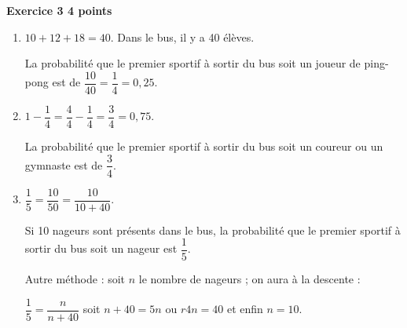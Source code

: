 \textbf{Exercice 3 \hfill 4 points}

\medskip

%

\begin{enumerate}
\item %
$10 + 12 +18 = 40$. Dans le bus, il y a 40 élèves.

La probabilité que le premier sportif à sortir du bus soit un joueur de ping-pong est de
$\dfrac{10}{40} = \dfrac{1}{4}  = 0,25$.
\item %
$1 - \dfrac{1}{4}  = \dfrac{4}{4} - \dfrac{1}{4} = \dfrac{3}{4} = 0,75$.

La probabilité que le premier sportif à sortir du bus soit un coureur ou un gymnaste est de
$\dfrac{3}{4}$.
\item %

$\dfrac{1}{5} = \dfrac{10}{50} = \dfrac{10}{10+40}$.

Si 10 nageurs sont présents dans le bus, la probabilité
que le premier sportif à sortir du bus soit un nageur est
$\dfrac{1}{5}$.

Autre méthode : soit $n$ le nombre de nageurs ; on aura à la descente :

$\dfrac{1}{5} = \dfrac{n}{n + 40}$ soit $n + 40 = 5n$ ou $r4n = 40$ et enfin $n = 10$.
\end{enumerate}

\vspace{0,5cm}

